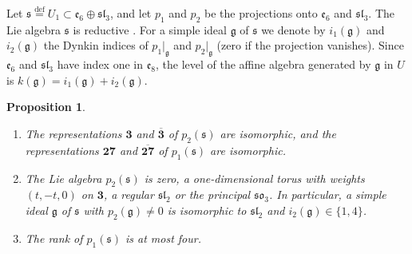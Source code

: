 \documentclass[leqno]{article}
\newcommand{\ov}{\overset}
\newtheorem{prop}[thm]{Proposition}
\numberwithin{equation}{section}
\begin{document}
Let $\mathfrak s \ov{\mathrm{def}}{=} U_1 \subset \mathfrak e_6 \oplus \mathfrak{sl}_3$, and let $p_1$ and $p_2$ be the projections onto $\mathfrak e_6$ and $\mathfrak{sl}_3$. The Lie algebra $\mathfrak s$ is reductive \cite[Theorem 1 p.~2]{DoM04}. For a simple ideal $\mathfrak g$ of $\mathfrak s$ we denote by $i_1(\mathfrak g)$ and $i_2(\mathfrak g)$ the Dynkin indices of $p_1|_{\mathfrak g}$ and $p_2|_{\mathfrak g}$ (zero if the projection vanishes). Since $\mathfrak e_6$ and $\mathfrak{sl}_3$ have index one in $\mathfrak e_8$, the level of the affine algebra generated by $\mathfrak g$ in $U$ is $k(\mathfrak g) = i_1(\mathfrak g)+i_2(\mathfrak g)$.

\begin{prop}
\label{prop:self-dual}
\begin{enumerate}
\item The representations $\mathbf 3$ and $\overline{\mathbf 3}$ of $p_2(\mathfrak s)$ are isomorphic, and the representations $\mathbf{27}$ and $\overline{\mathbf{27}}$ of $p_1(\mathfrak s)$ are isomorphic.
\item The Lie algebra $p_2(\mathfrak s)$ is zero, a one-dimensional torus with weights $(t,-t,0)$ on $\mathbf 3$, a regular $\mathfrak{sl}_2$ or the principal $\mathfrak{so}_3$. In particular, a simple ideal $\mathfrak g$ of $\mathfrak s$ with $p_2(\mathfrak g) \neq 0$ is isomorphic to $\mathfrak{sl}_2$ and $i_2(\mathfrak g) \in \{1,4\}$.
\item The rank of $p_1(\mathfrak s)$ is at most four.
\end{enumerate}
\end{prop}
\end{document}
